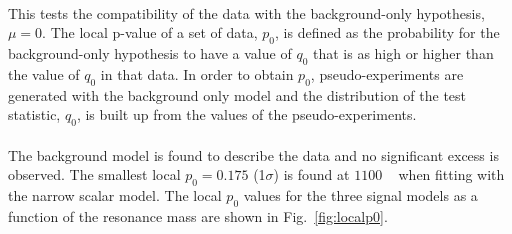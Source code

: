 \paragraph{}
This tests the compatibility of the data with the background-only hypothesis, $\mu = 0$. 
The local p-value of a set of data, $p_0$, is defined as the probability for the 
background-only hypothesis to have a value of $q_0$ that is as high or higher than the 
value of $q_{0}$ in that data.
In order to obtain $p_0$, pseudo-experiments are generated with the background only 
model and the distribution of the test statistic, $q_{0}$, is built up from the 
values of the pseudo-experiments.


\paragraph{}
The background model is found to describe the data and no significant excess is observed. 
The smallest local $p_0=0.175$ (1$\sigma$) is found at $1100$ \GeV~ when fitting with the narrow scalar model. The local $p_0$ values for the three signal models as a function of the resonance mass are shown in Fig.~\ref{fig:localp0}.

